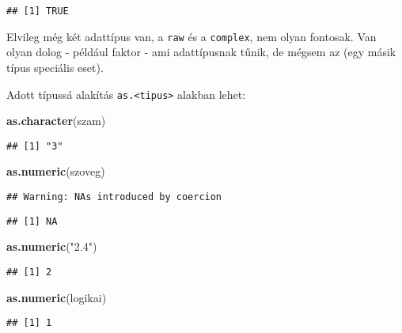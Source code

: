 \documentclass[]{book}
\newenvironment{Shaded}{\begin{snugshade}}{\end{snugshade}}
\newcommand{\KeywordTok}[1]{\textcolor[rgb]{0.13,0.29,0.53}{\textbf{#1}}}
\newcommand{\StringTok}[1]{\textcolor[rgb]{0.31,0.60,0.02}{#1}}
\newcommand{\NormalTok}[1]{#1}
\begin{document}
\begin{verbatim}
## [1] TRUE
\end{verbatim}

Elvileg még két adattípus van, a \texttt{raw} és a \texttt{complex}, nem
olyan fontosak. Van olyan dolog - például faktor - ami adattípusnak
tűnik, de mégsem az (egy másik típus speciális eset).

Adott típussá alakítás \texttt{as.\textless{}tipus\textgreater{}}
alakban lehet:

\begin{Shaded}
\begin{Highlighting}[]
\KeywordTok{as.character}\NormalTok{(szam)}
\end{Highlighting}
\end{Shaded}

\begin{verbatim}
## [1] "3"
\end{verbatim}

\begin{Shaded}
\begin{Highlighting}[]
\KeywordTok{as.numeric}\NormalTok{(szoveg)}
\end{Highlighting}
\end{Shaded}

\begin{verbatim}
## Warning: NAs introduced by coercion
\end{verbatim}

\begin{verbatim}
## [1] NA
\end{verbatim}

\begin{Shaded}
\begin{Highlighting}[]
\KeywordTok{as.numeric}\NormalTok{(}\StringTok{"2.4"}\NormalTok{)}
\end{Highlighting}
\end{Shaded}

\begin{verbatim}
## [1] 2
\end{verbatim}

\begin{Shaded}
\begin{Highlighting}[]
\KeywordTok{as.numeric}\NormalTok{(logikai)}
\end{Highlighting}
\end{Shaded}

\begin{verbatim}
## [1] 1
\end{verbatim}
\end{document}
